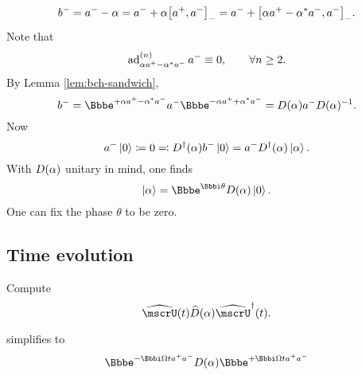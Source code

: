 \begin{equation}
b^- = a^- - \alpha = a^- + \alpha{\left[a^+, a^-\right]}_-
= a^- + {\left[\alpha a^+ - \alpha^* a^-, a^-\right]}_-.
\end{equation}
Note that
\begin{equation}
\operatorname{ad}_{\alpha a^+ - \alpha^* a^-}^{{\left(n\right)}}a^- \equiv 0,\qquad\forall n \ge 2.
\end{equation}
By Lemma \ref{lem:bch-sandwich},
\begin{equation}
b^- = \ee^{+\alpha a^+ - \alpha^* a^-}a^-\ee^{-\alpha a^+ + \alpha^* a^-}
= \rfun{D}{\alpha} a^- \rfun{D}{\alpha}^{-1}.
\end{equation}
Now
\begin{equation}
a^-\Ket{0} \coloneqq 0 \eqqcolon {D^\dagger}\mathopen{}\left(\alpha\right)\mathclose{} b^- \Ket{0}
= a^- {D^\dagger}\mathopen{}\left(\alpha\right)\mathclose{} \Ket{\alpha}.
\end{equation}
With ${D}\mathopen{}\left(\alpha\right)\mathclose{}$ unitary in mind, one finds
\begin{equation}
\Ket{\alpha} = \ee^{\ii\theta}\rfun{D}{\alpha}\Ket{0}.
\end{equation}
One can fix the phase $\theta$ to be zero.

\subsection{Time evolution}

Compute
\begin{equation}
\rfun{\widehat{\mscrU}}{t} \rfun{\widehat{D}}{\alpha}
\rfun{\widehat{\mscrU}^\dagger}{t}.
\label{eq:tim-evo-disp-1}
\end{equation}

 simplifies to
\begin{equation}
\ee^{-\ii \Omega t a^+ a^-} \rfun{D}{\alpha}
\ee^{+\ii \Omega t a^+ a^-}
\label{eq:tim-evo-disp-2}
\end{equation}

